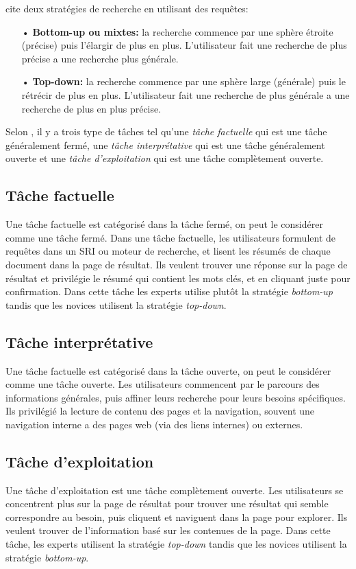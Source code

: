 \citeauthor{ir-on-web} \citep{ir-on-web} cite deux stratégies de recherche en utilisant des requêtes:
\begin{itemize}
    \item[•] \textbf{Bottom-up ou mixtes:} la recherche commence par une sphère étroite (précise) puis l’élargir de plus en plus. L'utilisateur fait une recherche de plus précise a une recherche plus générale.
    \item[•] \textbf{Top-down:} la recherche commence par une sphère large (générale) puis le rétrécir de plus en plus. L'utilisateur fait une recherche de plus générale a une recherche de plus en plus précise.
\end{itemize}

Selon \citeauthor{ri-sur-le-web} \citep{ri-sur-le-web}, il y a trois type de tâches tel qu'une \textit{tâche factuelle} qui est une tâche généralement fermé, une \textit{tâche interprétative} qui est une tâche généralement ouverte et une \textit{tâche d'exploitation} qui est une tâche complètement ouverte.

\subsection{Tâche factuelle}
Une tâche factuelle est catégorisé dans la tâche fermé, on peut le considérer comme une tâche fermé. Dans une tâche factuelle, les utilisateurs formulent de requêtes dans un SRI ou moteur de recherche, et lisent les résumés de chaque document dans la page de résultat. Ils veulent trouver une réponse sur la page de résultat et privilégie le résumé qui contient les mots clés, et en cliquant juste pour confirmation. Dans cette tâche les experts utilise plutôt la stratégie \emph{bottom-up} tandis que les novices utilisent la stratégie \emph{top-down}.

\subsection{Tâche interprétative}
Une tâche factuelle est catégorisé dans la tâche ouverte, on peut le considérer comme une tâche ouverte. Les utilisateurs commencent par le parcours des informations générales, puis affiner leurs recherche pour leurs besoins spécifiques. Ils privilégié la lecture de contenu des pages et la navigation, souvent une navigation interne a des pages web (via des liens internes) ou externes.

\subsection{Tâche d'exploitation}
Une tâche d'exploitation est une tâche complètement ouverte. Les utilisateurs se concentrent plus sur la page de résultat pour trouver une résultat qui semble correspondre au besoin, puis cliquent et naviguent dans la page pour explorer. Ils veulent trouver de l'information basé sur les contenues de la page. Dans cette tâche, les experts utilisent la stratégie \emph{top-down} tandis que les novices utilisent la stratégie \emph{bottom-up}.

